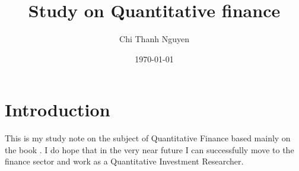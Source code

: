 \documentclass[11pt,a4paper]{report}
\begin{document}
\title{Study on Quantitative finance}
\author{Chi Thanh Nguyen}
\date{\today \@ \currenttime}
\maketitle

\tableofcontents


\chapter{Introduction}
This is my study note on the subject of Quantitative Finance based mainly on the book \cite{pw_iqf2ed_2007}. I do hope that in the very near future I can successfully move to the finance sector and work as a Quantitative Investment Researcher. 


\appendix 
%
%
%
%
%
%



\printindex



\end{document}

